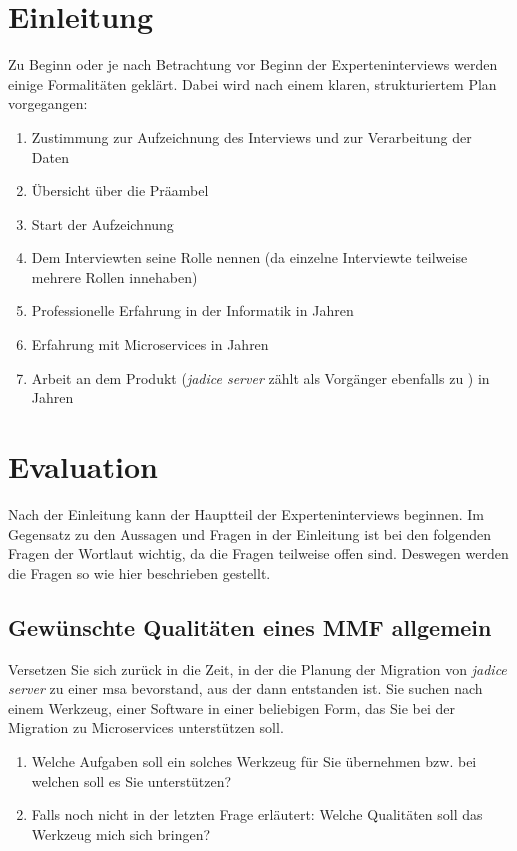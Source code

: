 \section{Einleitung}

Zu Beginn oder je nach Betrachtung vor Beginn der Experteninterviews werden einige Formalitäten geklärt.
Dabei wird nach einem klaren, strukturiertem Plan vorgegangen:

\begin{enumerate}
	\item Zustimmung zur Aufzeichnung des Interviews und zur Verarbeitung der Daten
	\item Übersicht über die Präambel
	\item Start der Aufzeichnung
	\item Dem Interviewten seine Rolle nennen (da einzelne Interviewte teilweise mehrere Rollen innehaben)
	\item Professionelle Erfahrung in der Informatik in Jahren
	\item Erfahrung mit Microservices in Jahren
	\item Arbeit an dem Produkt (\emph{jadice server} zählt als Vorgänger ebenfalls zu \jf) in Jahren
\end{enumerate}

\section{Evaluation}

Nach der Einleitung kann der Hauptteil der Experteninterviews beginnen.
Im Gegensatz zu den Aussagen und Fragen in der Einleitung ist bei den folgenden Fragen der Wortlaut wichtig, da die Fragen teilweise offen sind.
Deswegen werden die Fragen so wie hier beschrieben gestellt.

\subsection{Gewünschte Qualitäten eines MMF allgemein}

Versetzen Sie sich zurück in die Zeit, in der die Planung der Migration von \emph{jadice server} zu einer \acrlong{msa} bevorstand, aus der dann \jf entstanden ist.
Sie suchen nach einem Werkzeug, einer Software in einer beliebigen Form, das Sie bei der Migration zu Microservices unterstützen soll.

\begin{enumerate}
	\item Welche Aufgaben soll ein solches Werkzeug für Sie übernehmen bzw. bei welchen soll es Sie unterstützen?
	\item Falls noch nicht in der letzten Frage erläutert: Welche Qualitäten soll das Werkzeug mich sich bringen?
\end{enumerate}

